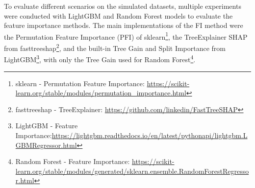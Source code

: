 To evaluate different scenarios on the simulated datasets, multiple experiments were conducted with LightGBM and Random Forest models to evaluate the feature importance methods.
The main implementations of the FI method were the Permutation Feature Importance (PFI) of sklearn\footnote{sklearn - Permutation Feature Importance: \url{https://scikit-learn.org/stable/modules/permutation_importance.html}}, the TreeExplainer SHAP from fasttreeshap\footnote{fasttreeshap - TreeExplainer: \url{https://github.com/linkedin/FastTreeSHAP}}, and the built-in Tree Gain and Split Importance from LightGBM\footnote{LightGBM - Feature Importance:\url{https://lightgbm.readthedocs.io/en/latest/pythonapi/lightgbm.LGBMRegressor.html}}, with only the Tree Gain used for Random Forest\footnote{Random Forest - Feature Importance: \url{https://scikit-learn.org/stable/modules/generated/sklearn.ensemble.RandomForestRegressor.html}}.